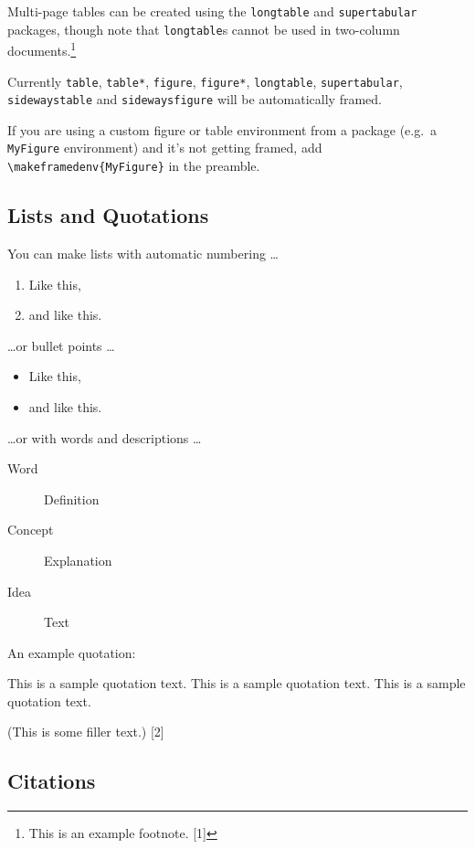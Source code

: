 \documentclass[biblatex,nonblind]{apsr_submission}
\begin{document}
Multi-page tables can be created using the \texttt{longtable} and \texttt{supertabular} packages, though note that \texttt{longtable}s cannot be used in two-column documents.\footnote{This is an example footnote. [1]}


Currently \texttt{table}, \texttt{table*}, \texttt{figure}, \texttt{figure*}, \texttt{longtable}, \texttt{supertabular}, \texttt{sidewaystable} and \texttt{sidewaysfigure} will be automatically framed.

If you are using a custom figure or table environment from a package (e.g.~a \texttt{MyFigure} environment) and it's not getting framed, add \verb|\makeframedenv{MyFigure}| in the preamble. 

\subsection{Lists and Quotations}

You can make lists with automatic numbering \dots

\begin{enumerate}
\item Like this,
\item and like this.
\end{enumerate}

\dots or bullet points \dots

\begin{itemize} 
\item Like this,
\item and like this.
\end{itemize}

\dots or with words and descriptions \dots

\begin{description}
\item[Word] Definition
\item[Concept] Explanation
\item[Idea] Text
\end{description}

An example quotation:

\begin{quoting}
This is a sample quotation text. This is a sample quotation text. This is a sample quotation text.
\end{quoting}

(This is some filler text.) [2]

\subsection{Citations}
\end{document}
